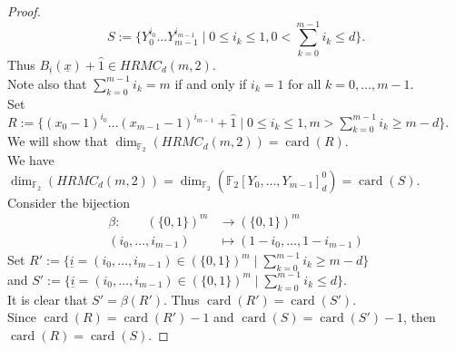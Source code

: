 \documentclass{article}
\theoremstyle{plain}
\theoremstyle{definition}
\DeclareMathOperator{\card}{card}
\begin{document}
\begin{proof}
\begin{equation*}
S:=\{Y_0^{i_0}\ldots Y_{m-1}^{i_{m-1}}\mid 0\leq i_{k}\leq 1,0< \sum_{k=0}^{m-1}i_{k}\leq d\}.
\end{equation*}
Thus $B_{\underline{i}}(\underline{x})+\hat{1}\in HRMC_{d}(m,2)$.\\
Note also that $\sum_{k=0}^{m-1}i_{k}=m$ if and only if $i_{k}=1$ for all $k=0,\ldots,m-1$.\\
Set $R:=\{(x_{0}-1)^{i_0}\ldots (x_{m-1}-1)^{i_{m-1}}+\hat{1}\mid 0\leq i_{k}\leq 1, m>\sum_{k=0}^{m-1}i_{k}\geq m-d\}$.\\
We will show that $\dim_{\mathbb{F}_{2}}(HRMC_{d}(m,2))=\card(R)$.\\
We have $\dim_{\mathbb{F}_{2}}(HRMC_{d}(m,2))=\dim_{\mathbb{F}_{2}}(\mathbb{F}_{2}[Y_{0},\ldots,Y_{m-1}]_{d}^{0})=\card(S)$.\\
Consider the bijection
\begin{equation*}
\begin{aligned}
\beta :\quad\quad (\{0,1\})^{m} &\longrightarrow (\{0,1\})^{m}\\
         (i_{0},\ldots,i_{m-1})&\longmapsto (1-i_{0},\ldots,1-i_{m-1})
\end{aligned}
\end{equation*}
Set $R':=\{\underline{i}=(i_{0},\ldots,i_{m-1})\in (\{0,1\})^{m}\mid \sum_{k=0}^{m-1}i_{k}\geq m-d\}$\\
and $S':=\{\underline{i}=(i_{0},\ldots,i_{m-1})\in (\{0,1\})^{m}\mid \sum_{k=0}^{m-1}i_{k}\leq d\}$.\\
It is clear that $S'=\beta(R')$. Thus $\card(R')=\card(S')$.\\
Since $\card(R)=\card(R')-1$ and $\card(S)=\card(S')-1$, then $\card(R)=\card(S)$.
\end{proof}
\end{document}
